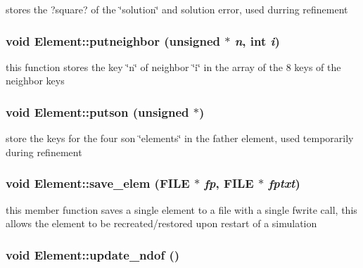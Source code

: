 stores the ?square? of the \char`\"{}solution\char`\"{} and solution error, used durring refinement 

\hypertarget{classElement_a18}{
\subsubsection[putneighbor]{\setlength{\rightskip}{0pt plus 5cm}void Element::putneighbor (unsigned $\ast$ {\em n}, int {\em i})}}
\label{classElement_a18}


this function stores the key \char`\"{}n\char`\"{} of neighbor \char`\"{}i\char`\"{} in the array of the 8 keys of the neighbor keys 

\hypertarget{classElement_a14}{
\subsubsection[putson]{\setlength{\rightskip}{0pt plus 5cm}void Element::putson (unsigned $\ast$)}}
\label{classElement_a14}


store the keys for the four son \char`\"{}elements\char`\"{} in the father element, used temporarily during refinement 

\hypertarget{classElement_a6}{
\subsubsection[save\_\-elem]{\setlength{\rightskip}{0pt plus 5cm}void Element::save\_\-elem (FILE $\ast$ {\em fp}, FILE $\ast$ {\em fptxt})}}
\label{classElement_a6}


this member function saves a single element to a file with a single fwrite call, this allows the element to be recreated/restored upon restart of a simulation 

\hypertarget{classElement_a49}{
\subsubsection[update\_\-ndof]{\setlength{\rightskip}{0pt plus 5cm}void Element::update\_\-ndof ()}}
\label{classElement_a49}



